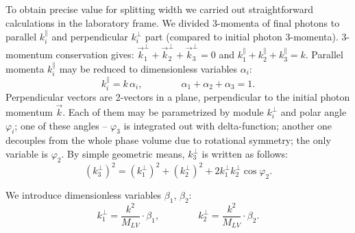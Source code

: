 \documentclass{webofc}
\begin{document}
To obtain precise value for splitting width we carried out straightforward calculations in the laboratory frame. We divided 3-momenta of final photons to parallel $k_i^\parallel$ and perpendicular $k_i^\perp$ part (compared to initial photon 3-momenta). 3-momentum conservation gives: $\vec{k}_1^\perp + \vec{k}_2^\perp +\vec{k}_3^\perp = 0$ and $k_1^\parallel +k_2^\parallel + k_3^\parallel = k$. Parallel momenta $k_i^\parallel$ may be reduced to dimensionless variables $\alpha_i$:
\begin{equation}
k_i^\parallel = k\, \alpha_i, \qquad \qquad \alpha_1 + \alpha_2+\alpha_3=1.
\end{equation}
Perpendicular vectors are 2-vectors in a plane, perpendicular to the initial photon momentum $\vec{k}$. Each of them may be parametrized by module $k_i^\perp$ and polar angle $\varphi_i$; one of these angles -- $\varphi_3$ is integrated out with delta-function; another one decouples from the whole phase volume due to rotational symmetry; the only variable is $\varphi_2$. By simple geometric means, $k_3^\perp$ is written as follows:
\begin{equation}
(k_3^\perp)^2 = (k_1^\perp)^2 + (k_2^\perp)^2 + 2k_1^\perp k_2^\perp \cos \varphi_2.
\end{equation} 

We introduce dimensionless variables $\beta_1$, $\beta_2$:
\begin{equation}
k_1^\perp = \frac{k^2}{M_{LV}}\cdot \beta_1, \qquad \qquad  k_2^\perp = \frac{k^2}{M_{LV}}\cdot \beta_2.
\end{equation}
\end{document}
